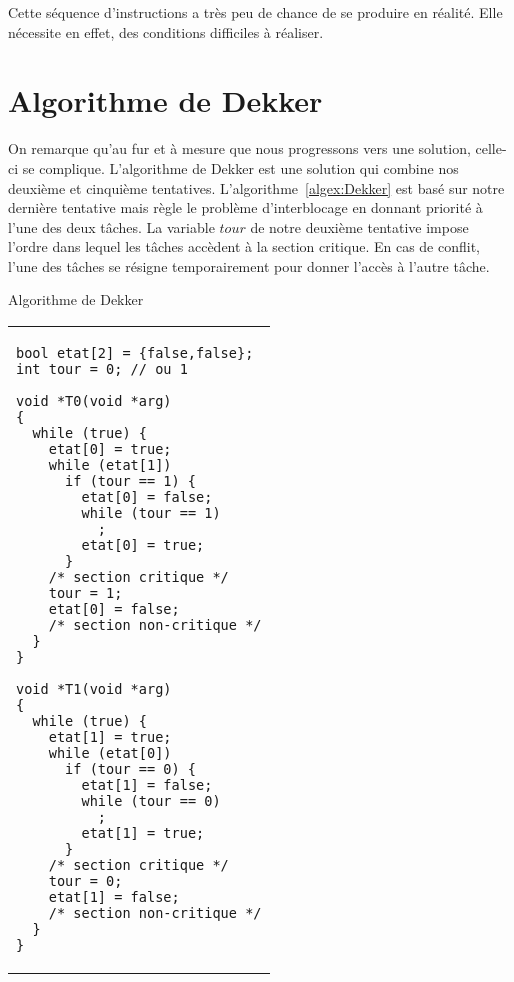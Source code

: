 \par\noindent
Cette séquence d'instructions a très peu de chance de se produire en réalité. Elle nécessite en effet, des conditions difficiles à réaliser.

\section{Algorithme de Dekker}
On remarque qu'au fur et à mesure que nous progressons vers une solution, celle-ci se complique. L'algorithme de Dekker est une solution qui combine nos deuxième et cinquième tentatives.
L'algorithme~\ref{algex:Dekker} est basé sur notre dernière tentative mais règle le problème d'interblocage en donnant priorité à l'une des deux tâches.  La variable $tour$ de notre deuxième tentative impose l'ordre dans lequel les tâches accèdent à la section critique.  En cas de conflit, l'une des tâches se résigne temporairement pour donner l'accès à l'autre tâche.
\begin{algorithm}[!ht]
  \caption{Algorithme de Dekker}\label{algex:Dekker}
  \centering
  \begin{tabular}{l}
    \lstset{language=C++}
    \begin{lstlisting}
bool etat[2] = {false,false};
int tour = 0; // ou 1

void *T0(void *arg)
{
  while (true) {
    etat[0] = true;
    while (etat[1])
      if (tour == 1) {
        etat[0] = false;
        while (tour == 1)
          ;
        etat[0] = true;
      }
    /* section critique */
    tour = 1;
    etat[0] = false;
    /* section non-critique */
  }
}

void *T1(void *arg)
{
  while (true) {
    etat[1] = true;
    while (etat[0])
      if (tour == 0) {
        etat[1] = false;
        while (tour == 0)
          ;
        etat[1] = true;
      }
    /* section critique */
    tour = 0;
    etat[1] = false;
    /* section non-critique */
  }
}
\end{lstlisting}
  \end{tabular}

\end{algorithm}


